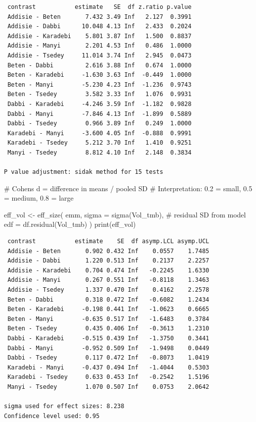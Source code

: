 \documentclass[
  letterpaper,
  DIV=11,
  numbers=noendperiod]{scrartcl}
\newenvironment{Shaded}{\begin{snugshade}}{\end{snugshade}}
\newcommand{\AttributeTok}[1]{\textcolor[rgb]{0.40,0.45,0.13}{#1}}
\newcommand{\CommentTok}[1]{\textcolor[rgb]{0.37,0.37,0.37}{#1}}
\newcommand{\FunctionTok}[1]{\textcolor[rgb]{0.28,0.35,0.67}{#1}}
\newcommand{\NormalTok}[1]{\textcolor[rgb]{0.00,0.23,0.31}{#1}}
\newcommand{\OtherTok}[1]{\textcolor[rgb]{0.00,0.23,0.31}{#1}}
\begin{document}
\begin{verbatim}
 contrast           estimate   SE  df z.ratio p.value
 Addisie - Beten       7.432 3.49 Inf   2.127  0.3991
 Addisie - Dabbi      10.048 4.13 Inf   2.433  0.2024
 Addisie - Karadebi    5.801 3.87 Inf   1.500  0.8837
 Addisie - Manyi       2.201 4.53 Inf   0.486  1.0000
 Addisie - Tsedey     11.014 3.74 Inf   2.945  0.0473
 Beten - Dabbi         2.616 3.88 Inf   0.674  1.0000
 Beten - Karadebi     -1.630 3.63 Inf  -0.449  1.0000
 Beten - Manyi        -5.230 4.23 Inf  -1.236  0.9743
 Beten - Tsedey        3.582 3.33 Inf   1.076  0.9931
 Dabbi - Karadebi     -4.246 3.59 Inf  -1.182  0.9828
 Dabbi - Manyi        -7.846 4.13 Inf  -1.899  0.5889
 Dabbi - Tsedey        0.966 3.89 Inf   0.249  1.0000
 Karadebi - Manyi     -3.600 4.05 Inf  -0.888  0.9991
 Karadebi - Tsedey     5.212 3.70 Inf   1.410  0.9251
 Manyi - Tsedey        8.812 4.10 Inf   2.148  0.3834

P value adjustment: sidak method for 15 tests 
\end{verbatim}

\begin{Shaded}
\begin{Highlighting}[]
\CommentTok{\# Cohen\textquotesingle{}s d = difference in means / pooled SD}
\CommentTok{\# Interpretation: 0.2 = small, 0.5 = medium, 0.8 = large}

\NormalTok{eff\_vol }\OtherTok{\textless{}{-}} \FunctionTok{eff\_size}\NormalTok{(}
\NormalTok{  emm,}
  \AttributeTok{sigma =} \FunctionTok{sigma}\NormalTok{(Vol\_tmb),   }\CommentTok{\# residual SD from model}
  \AttributeTok{edf   =} \FunctionTok{df.residual}\NormalTok{(Vol\_tmb)}
\NormalTok{)}
\FunctionTok{print}\NormalTok{(eff\_vol)}
\end{Highlighting}
\end{Shaded}

\begin{verbatim}
 contrast           estimate    SE  df asymp.LCL asymp.UCL
 Addisie - Beten       0.902 0.432 Inf    0.0557    1.7485
 Addisie - Dabbi       1.220 0.513 Inf    0.2137    2.2257
 Addisie - Karadebi    0.704 0.474 Inf   -0.2245    1.6330
 Addisie - Manyi       0.267 0.551 Inf   -0.8118    1.3463
 Addisie - Tsedey      1.337 0.470 Inf    0.4162    2.2578
 Beten - Dabbi         0.318 0.472 Inf   -0.6082    1.2434
 Beten - Karadebi     -0.198 0.441 Inf   -1.0623    0.6665
 Beten - Manyi        -0.635 0.517 Inf   -1.6483    0.3784
 Beten - Tsedey        0.435 0.406 Inf   -0.3613    1.2310
 Dabbi - Karadebi     -0.515 0.439 Inf   -1.3750    0.3441
 Dabbi - Manyi        -0.952 0.509 Inf   -1.9498    0.0449
 Dabbi - Tsedey        0.117 0.472 Inf   -0.8073    1.0419
 Karadebi - Manyi     -0.437 0.494 Inf   -1.4044    0.5303
 Karadebi - Tsedey     0.633 0.453 Inf   -0.2542    1.5196
 Manyi - Tsedey        1.070 0.507 Inf    0.0753    2.0642

sigma used for effect sizes: 8.238 
Confidence level used: 0.95 
\end{verbatim}
\end{document}
